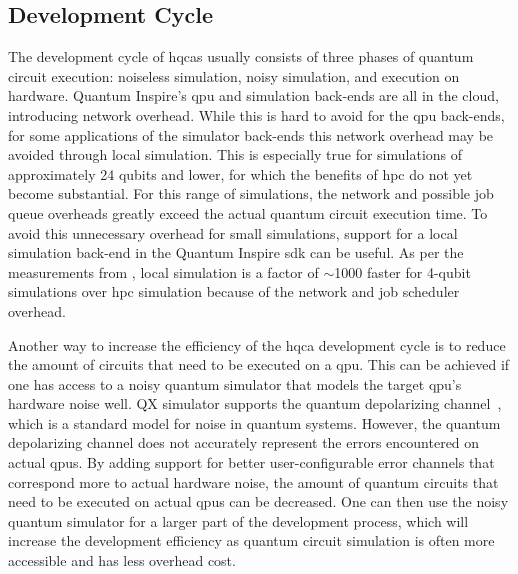 \subsection{Development Cycle} \label{sec:dev-cycle}
The development cycle of \glspl{hqca} usually consists of three phases of quantum circuit execution: noiseless simulation, noisy simulation, and execution on hardware.
Quantum Inspire's \gls{qpu} and simulation back-ends are all in the cloud, introducing network overhead.
While this is hard to avoid for the \gls{qpu} back-ends, for some applications of the simulator back-ends this network overhead may be avoided through local simulation.
This is especially true for simulations of approximately 24 qubits and lower, for which the benefits of \gls{hpc} do not yet become substantial.
For this range of simulations, the network and possible job queue overheads greatly exceed the actual quantum circuit execution time.
To avoid this unnecessary overhead for small simulations, support for a local simulation back-end in the Quantum Inspire \gls{sdk} can be useful.
As per the measurements from , local simulation is a factor of $\sim$1000 faster for 4-qubit simulations over \gls{hpc} simulation because of the network and job scheduler overhead.

Another way to increase the efficiency of the \gls{hqca} development cycle is to reduce the amount of circuits that need to be executed on a \gls{qpu}.
This can be achieved if one has access to a noisy quantum simulator that models the target \gls{qpu}'s hardware noise well.
QX simulator supports the quantum depolarizing channel~\cite[Section 8.3.4]{nielsen2002quantum}, which is a standard model for noise in quantum systems.
However, the quantum depolarizing channel does not accurately represent the errors encountered on actual \glspl{qpu}.
By adding support for better user-configurable error channels that correspond more to actual hardware noise, the amount of quantum circuits that need to be executed on actual \glspl{qpu} can be decreased.
One can then use the noisy quantum simulator for a larger part of the development process, which will increase the development efficiency as quantum circuit simulation is often more accessible and has less overhead cost.

